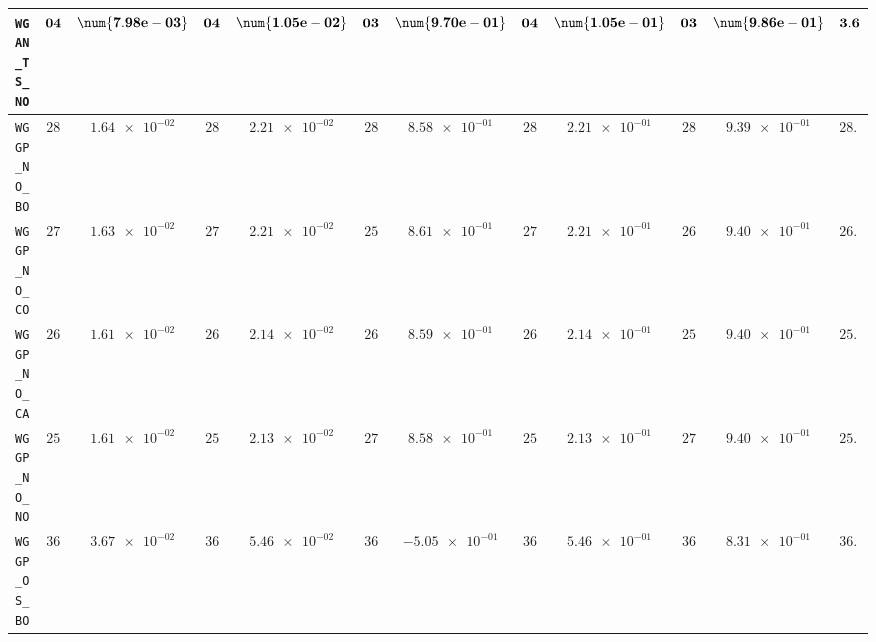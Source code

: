 \begin{table}[H]
\begin{tabularx}{\textwidth}{l||cC|cC|cC|cC|cC||c}
		\texttt{WGAN\_TS\_NO} & $\bf 04$ & $\bf \num{7.98e-03}$ & $\bf 04$ & $\bf \num{1.05e-02}$ & $\bf 03$ & $\bf \num{9.70e-01}$ & $\bf 04$ & $\bf \num{1.05e-01}$ & $\bf 03$ & $\bf \num{9.86e-01}$ & $\bf 3.6$  \\ \hline
		\texttt{WGGP\_NO\_BO} & $ 28$ & $ \num{1.64e-02}$ & $ 28$ & $ \num{2.21e-02}$ & $ 28$ & $ \num{8.58e-01}$ & $ 28$ & $ \num{2.21e-01}$ & $ 28$ & $ \num{9.39e-01}$ & $ 28.0$  \\
		\texttt{WGGP\_NO\_CO} & $ 27$ & $ \num{1.63e-02}$ & $ 27$ & $ \num{2.21e-02}$ & $ 25$ & $ \num{8.61e-01}$ & $ 27$ & $ \num{2.21e-01}$ & $ 26$ & $ \num{9.40e-01}$ & $ 26.4$  \\
		\texttt{WGGP\_NO\_CA} & $ 26$ & $ \num{1.61e-02}$ & $ 26$ & $ \num{2.14e-02}$ & $ 26$ & $ \num{8.59e-01}$ & $ 26$ & $ \num{2.14e-01}$ & $ 25$ & $ \num{9.40e-01}$ & $ 25.8$  \\
		\texttt{WGGP\_NO\_NO} & $ 25$ & $ \num{1.61e-02}$ & $ 25$ & $ \num{2.13e-02}$ & $ 27$ & $ \num{8.58e-01}$ & $ 25$ & $ \num{2.13e-01}$ & $ 27$ & $ \num{9.40e-01}$ & $ 25.8$  \\
		\texttt{WGGP\_OS\_BO} & $ 36$ & $ \num{3.67e-02}$ & $ 36$ & $ \num{5.46e-02}$ & $ 36$ & $ \num{-5.05e-01}$ & $ 36$ & $ \num{5.46e-01}$ & $ 36$ & $ \num{8.31e-01}$ & $ 36.0$  \\

\end{tabularx}
\end{table}
